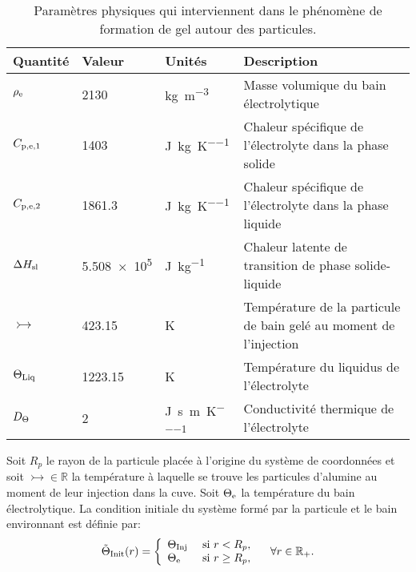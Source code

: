 \begin{table}[h]
  \begin{center}
    \caption{Paramètres physiques qui interviennent dans le
      phénomène de formation de gel autour des particules.}
    \label{tab:freeze-physical-parameters}
    \begin{tabularx}{\textwidth}{@{}lllX@{}}
      \toprule
      Quantité              & Valeur       & Unités                                       & Description \\
      \midrule
      $\rho_\mathrm{e}$ & \num{2130}    & \si{\kg\per\cubic\meter}                    & Masse volumique du bain électrolytique \\
      $C_{\mathrm{p,e,1}}$     & \num{1403}    & \si{\joule\per\kilo\gram\per\kelvin}        & Chaleur spécifique de l'électrolyte dans la phase solide \\
      $C_{\mathrm{p,e,2}}$     & \num{1861.3}  & \si{\joule\per\kilo\gram\per\kelvin}        & Chaleur spécifique de l'électrolyte dans la phase liquide \\
      $\Delta H_\mathrm{sl}$     & \num{5.508e5} & \si{\joule\per\kilo\gram}                   & Chaleur latente de transition de phase solide-liquide \\
      $\tinj$               & \num{423.15}  & \si{\kelvin}                                & Température de la particule de bain gelé au moment de l'injection \\
      $\Theta_\text{Liq}$               & \num{1223.15} & \si{\kelvin}                                & Température du liquidus de l'électrolyte \\
      $D_\Theta$   & \num{2}       & \si{\joule\per\second\per\meter\per\kelvin} & Conductivité thermique de l'électrolyte \\
      \bottomrule
    \end{tabularx}
\end{center}
\end{table}

Soit $R_p$ le rayon de la particule placée à l'origine du système de
coordonnées et soit $\tinj\in\mathbb R$ la température à laquelle se
trouve les particules d'alumine au moment de leur injection dans la
cuve. Soit $\Theta_\mathrm{e}$ la température du bain électrolytique. La
condition initiale du système formé par la particule et le bain
environnant est définie par:
\begin{equation}
  \tilde{\Theta}_\text{Init}(r) = \left\{
  \begin{array}{ll}
    \Theta_\text{Inj} & \text{ si } r < R_p,\\
    \Theta_\mathrm{e} & \text{ si } r \geq R_p,\\
  \end{array}
  \right.\quad \forall r\in {\mathbb R_+} .\label{eq:initial-temperature}
\end{equation}

